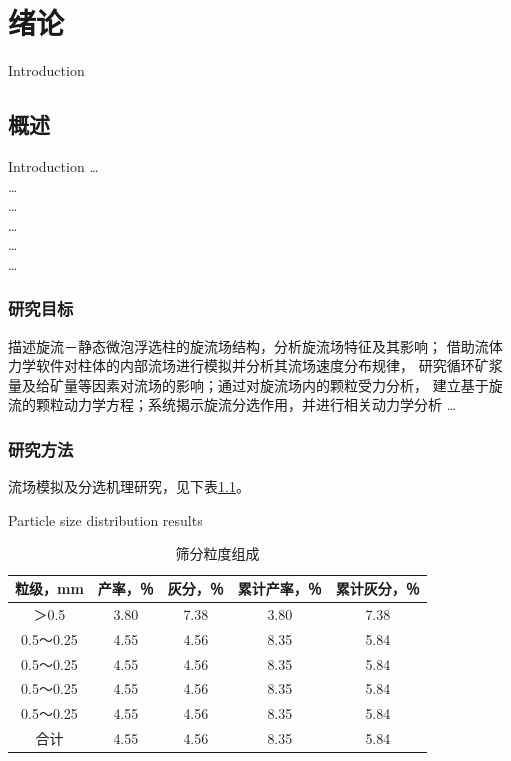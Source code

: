 \chapter{绪论}{Introduction}
\section{概述}{Introduction}
\dots\\
\dots\\
\dots\\

\dots\\
\dots\\
\dots\\

\subsection{研究目标}
描述旋流－静态微泡浮选柱的旋流场结构，分析旋流场特征及其影响；
借助流体力学软件对柱体的内部流场进行模拟并分析其流场速度分布规律，
研究循环矿浆量及给矿量等因素对流场的影响；通过对旋流场内的颗粒受力分析，
建立基于旋流的颗粒动力学方程；系统揭示旋流分选作用，并进行相关动力学分析 \dots 

\subsection{研究方法}
流场模拟及分选机理研究，见下表\ref{tab:particle-size-distribution-results}。\\ 

\begin{table}
    \linespread{1.5}
    \centering
    \caption{筛分粒度组成}{Particle size distribution results}
    \label{tab:particle-size-distribution-results}
    \begin{tabular}{ccccc}
    \bottomrule
    粒级，mm    & 产率，％ & 灰分，％ & 累计产率，％ & 累计灰分，％ \\ \hline
    ＞0.5     & 3.80 & 7.38 & 3.80   & 7.38   \\
    0.5～0.25 & 4.55 & 4.56 & 8.35   & 5.84   \\
    0.5～0.25 & 4.55 & 4.56 & 8.35   & 5.84   \\
    0.5～0.25 & 4.55 & 4.56 & 8.35   & 5.84   \\
    0.5～0.25 & 4.55 & 4.56 & 8.35   & 5.84   \\
    合计       & 4.55 & 4.56 & 8.35   & 5.84   \\ \bottomrule
    \end{tabular}
\end{table}


